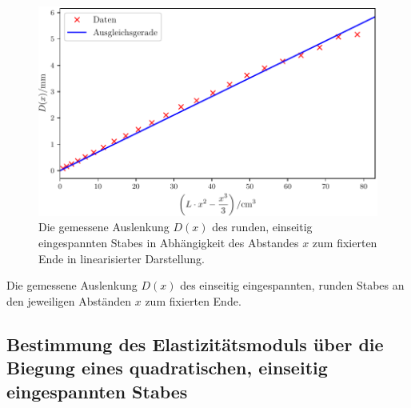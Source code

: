 \begin{figure}
	\centering
	\includegraphics[scale=.8]{content/images/StabRundEinseitig2.pdf}
	\caption{Die gemessene Auslenkung $D(x)$ des runden, einseitig eingespannten Stabes in Abhängigkeit des Abstandes $x$ zum fixierten Ende in linearisierter Darstellung.}
	\label{fig:rundlinear}
\end{figure}
\begin{table}
	\caption{Die gemessene Auslenkung $D(x)$ des einseitig eingespannten, runden Stabes an den jeweiligen Abständen $x$ zum fixierten Ende.}
	\begin{minipage}{0.5\textwidth}
		\centering
		
	\end{minipage}
	\begin{minipage}{0.5\textwidth}
		\centering
		
	\end{minipage}
\end{table}

\subsection{Bestimmung des Elastizitätsmoduls über die Biegung eines quadratischen, einseitig eingespannten Stabes}\label{subsec:QuadratischEinseitig}

